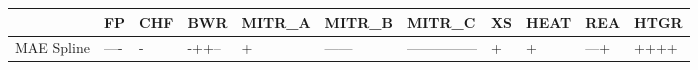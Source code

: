 \begin{tabular}{lllllllllll}
\toprule
 & FP & CHF & BWR & MITR_A & MITR_B & MITR_C & XS & HEAT & REA & HTGR \\
\midrule
MAE Spline & ---- & - & -++-- & + & ------ & --------------- & + & + & ---+ & ++++ \\
\bottomrule
\end{tabular}
